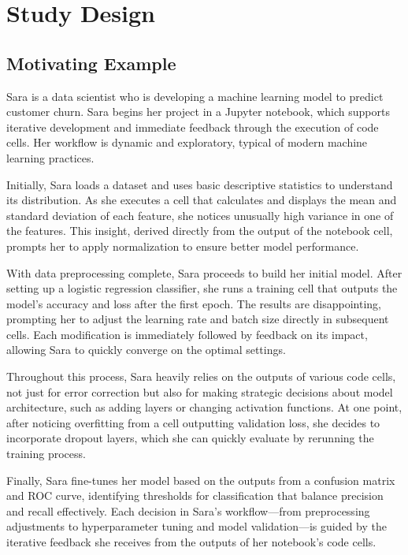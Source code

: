 \section{Study Design}

\subsection{Motivating Example}

Sara is a data scientist who is developing a machine learning model to predict customer churn. Sara begins her project in a Jupyter notebook, which supports iterative development and immediate feedback through the execution of code cells. Her workflow is dynamic and exploratory, typical of modern machine learning practices.

Initially, Sara loads a dataset and uses basic descriptive statistics to understand its distribution. As she executes a cell that calculates and displays the mean and standard deviation of each feature, she notices unusually high variance in one of the features. This insight, derived directly from the output of the notebook cell, prompts her to apply normalization to ensure better model performance.

With data preprocessing complete, Sara proceeds to build her initial model. After setting up a logistic regression classifier, she runs a training cell that outputs the model's accuracy and loss after the first epoch. The results are disappointing, prompting her to adjust the learning rate and batch size directly in subsequent cells. Each modification is immediately followed by feedback on its impact, allowing Sara to quickly converge on the optimal settings.

Throughout this process, Sara heavily relies on the outputs of various code cells, not just for error correction but also for making strategic decisions about model architecture, such as adding layers or changing activation functions. At one point, after noticing overfitting from a cell outputting validation loss, she decides to incorporate dropout layers, which she can quickly evaluate by rerunning the training process.

Finally, Sara fine-tunes her model based on the outputs from a confusion matrix and ROC curve, identifying thresholds for classification that balance precision and recall effectively. Each decision in Sara's workflow—from preprocessing adjustments to hyperparameter tuning and model validation—is guided by the iterative feedback she receives from the outputs of her notebook's code cells.

